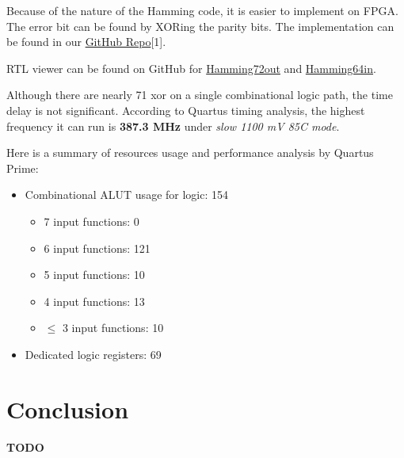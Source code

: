 \documentclass[conference]{IEEEtran}
\begin{document}
Because of the nature of the Hamming code, it is easier to implement on FPGA.
The error bit can be found by XORing the parity bits. The implementation can be
found in our \href{https://github.com/luckunately/ELEC433-Projects}{GitHub
  Repo}[1]. %

  RTL viewer can be found on GitHub for \href{https://github.com/luckunately/ELEC433-Projects/blob/add-tex/Hamming72out/Hamming72out_RTL.pdf}{Hamming72out} and \href{https://github.com/luckunately/ELEC433-Projects/blob/add-tex/Hamming64in/Hamming64inRTL.pdf}{Hamming64in}.

Although there are nearly 71 xor on a single combinational logic path, the time
delay is not significant. According to Quartus timing analysis, the highest
frequency it can run is \textbf{387.3 MHz} under \textit{slow 1100 mV 85C
  mode}.

Here is a summary of resources usage and performance analysis by Quartus Prime:
\begin{itemize}
  \item Combinational ALUT usage for logic: 154
  \begin{itemize}
    \item 7 input functions: 0
    \item 6 input functions: 121
    \item 5 input functions: 10
    \item 4 input functions: 13
    \item $\leq$ 3 input functions: 10
  \end{itemize}
  \item Dedicated logic registers: 69
\end{itemize}


\section{Conclusion}
\textbf{TODO}
\end{document}
